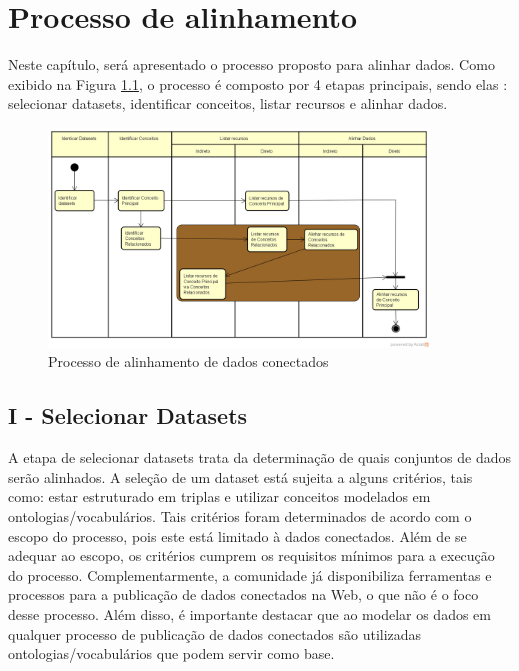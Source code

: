 \chapter{Processo de alinhamento}

Neste capítulo, será apresentado o processo proposto para alinhar dados. Como exibido na Figura \ref{fig:processo}, o processo é composto por 4 etapas principais, sendo elas : selecionar datasets, identificar conceitos, listar recursos e alinhar dados.

\begin{figure}[!ht]
	\centering
	\includegraphics[width=0.9\textwidth]{./imagens/processo.png}
    \caption{Processo de alinhamento de dados conectados}
	\label{fig:processo}
\end{figure}

\section*{I - Selecionar Datasets}
A etapa de selecionar datasets trata da determinação de quais conjuntos de dados serão alinhados. A seleção de um dataset está sujeita a alguns critérios, tais como: estar estruturado em triplas e utilizar conceitos modelados em ontologias/vocabulários. Tais critérios foram determinados de acordo com o escopo do processo, pois este está limitado à dados conectados. Além de se adequar ao escopo, os critérios cumprem os requisitos mínimos para a execução do processo.
Complementarmente, a comunidade já disponibiliza ferramentas e processos para a publicação de dados conectados na Web, o que não é o foco desse processo. Além disso, é importante destacar que ao modelar os dados em qualquer processo de publicação de dados conectados são utilizadas ontologias/vocabulários que podem servir como base.

